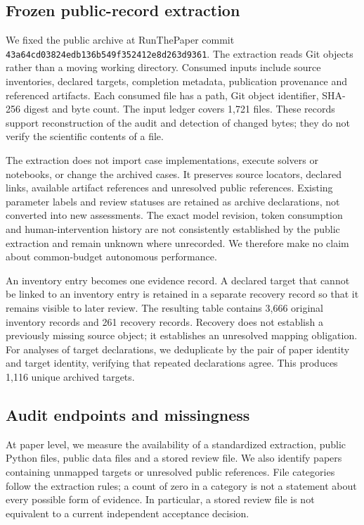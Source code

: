 \documentclass[10pt,a4paper]{article}
\begin{document}
\subsection{Frozen public-record
extraction}\label{frozen-public-record-extraction}

We fixed the public archive at RunThePaper commit
\texttt{43a64cd03824edb136b549f352412e8d263d9361}. The extraction reads
Git objects rather than a moving working directory. Consumed inputs
include source inventories, declared targets, completion metadata,
publication provenance and referenced artifacts. Each consumed file has
a path, Git object identifier, SHA-256 digest and byte count. The input
ledger covers 1,721 files. These records support reconstruction of the
audit and detection of changed bytes; they do not verify the scientific
contents of a file.

The extraction does not import case implementations, execute solvers or
notebooks, or change the archived cases. It preserves source locators,
declared links, available artifact references and unresolved public
references. Existing parameter labels and review statuses are retained
as archive declarations, not converted into new assessments. The exact
model revision, token consumption and human-intervention history are not
consistently established by the public extraction and remain unknown
where unrecorded. We therefore make no claim about common-budget
autonomous performance.

An inventory entry becomes one evidence record. A declared target that
cannot be linked to an inventory entry is retained in a separate
recovery record so that it remains visible to later review. The
resulting table contains 3,666 original inventory records and 261
recovery records. Recovery does not establish a previously missing
source object; it establishes an unresolved mapping obligation. For
analyses of target declarations, we deduplicate by the pair of paper
identity and target identity, verifying that repeated declarations
agree. This produces 1,116 unique archived targets.

\subsection{Audit endpoints and
missingness}\label{audit-endpoints-and-missingness}

At paper level, we measure the availability of a standardized
extraction, public Python files, public data files and a stored review
file. We also identify papers containing unmapped targets or unresolved
public references. File categories follow the extraction rules; a count
of zero in a category is not a statement about every possible form of
evidence. In particular, a stored review file is not equivalent to a
current independent acceptance decision.
\end{document}
